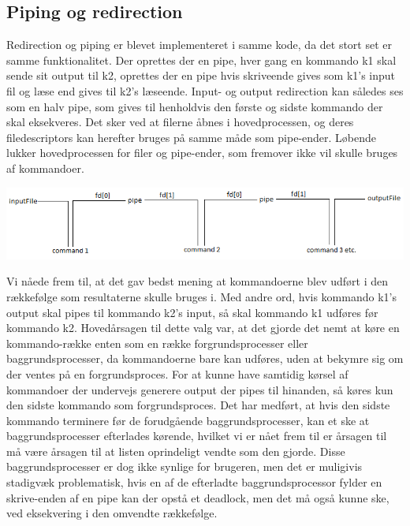 \subsection{Piping og redirection}
\label{subsec:pipe_redirect}
Redirection og piping er blevet implementeret i samme kode, da det stort set er samme funktionalitet.
Der oprettes der en pipe, hver gang en kommando k1 skal sende sit output til k2, oprettes der en pipe hvis skriveende gives som k1's input fil og læse end gives til k2's læseende. Input- og output redirection kan således ses som en halv pipe, som gives til henholdvis den første og sidste kommando der skal eksekveres. Det sker ved at filerne åbnes i hovedprocessen, og deres filedescriptors kan herefter bruges på samme måde som pipe-ender. Løbende lukker hovedprocessen for filer og pipe-ender, som fremover ikke vil skulle bruges af kommandoer.


\vspace{1cm}
\includegraphics[scale=0.75, trim= 2cm 0cm 0cm 0cm]{pipefig}

\vspace{1cm}

Vi nåede frem til, at det gav bedst mening at kommandoerne blev udført i den rækkefølge som resultaterne skulle bruges i.
Med andre ord, hvis kommando k1's output skal pipes til kommando k2's input, så skal kommando k1 udføres før kommando k2.
Hovedårsagen til dette valg var, at det gjorde det nemt at køre en kommando-række enten som en række forgrundsprocesser eller baggrundsprocesser, da kommandoerne bare kan udføres, uden at bekymre sig om der ventes på en forgrundsproces. For at kunne have samtidig kørsel af kommandoer der undervejs generere output der pipes til hinanden, så køres kun den sidste kommando som forgrundsproces. Det har medført, at hvis den sidste kommando terminere før de forudgående baggrundsprocesser, kan et ske at baggrundsprocesser efterlades kørende, hvilket vi er nået frem til er årsagen til må være årsagen til at listen oprindeligt vendte som den gjorde. Disse baggrundsprocesser er dog ikke synlige for brugeren, men det er muligivis stadigvæk problematisk, hvis en af de efterladte baggrundsprocessor fylder en skrive-enden af en pipe kan der opstå et deadlock, men det må også kunne ske, ved eksekvering i den omvendte rækkefølge.

